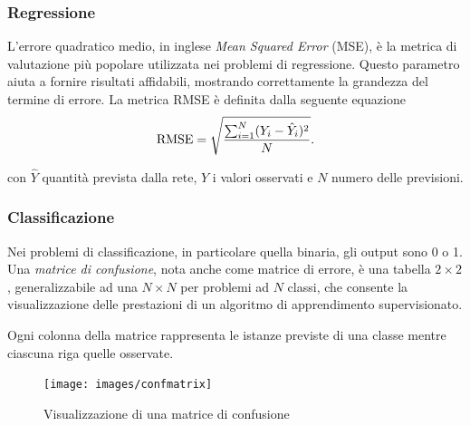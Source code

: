 \subsubsection{Regressione}
\label{subsubsec:regressione}

L'{errore quadratico medio}, in inglese \emph{Mean Squared Error} (MSE), è la metrica di valutazione più popolare utilizzata nei problemi di regressione. Questo parametro aiuta a fornire risultati affidabili, mostrando correttamente la grandezza del termine di errore.
La metrica RMSE è definita dalla seguente equazione
\begin{equation}
	\operatorname{RMSE} = \sqrt{\frac{\sum_{i=1}^{N}({Y}_i - \hat{Y}_i)^2}{N}} \mbox{.}
	\label{eq:rmse}
\end{equation}

con $\hat{Y}$ quantità prevista dalla rete, $Y$ i valori osservati e $N$ numero delle previsioni.
\subsubsection{Classificazione}
\label{subsubsec:classificazione}

Nei problemi di classificazione, in particolare quella binaria, gli output sono 0 o 1. \\
Una \emph{matrice di confusione}, nota anche come matrice di errore, è una tabella $2 \times 2$, generalizzabile ad una $N \times N$ per problemi ad $N$ classi, che consente la visualizzazione delle prestazioni di un algoritmo di apprendimento supervisionato. 

Ogni colonna della matrice rappresenta le istanze previste di una classe mentre ciascuna riga quelle osservate. 

\begin{figure}[H]
	\centering
	{\texttt{[image: images/confmatrix]}}
	\caption{Visualizzazione di una matrice di confusione}
	\label{fig:confmat}
\end{figure}

